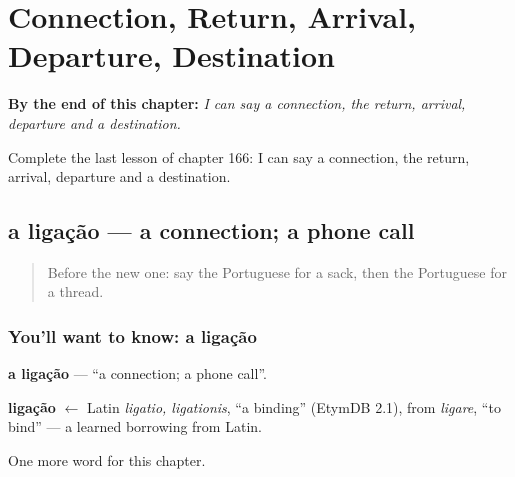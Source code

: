 
\chapter{Connection, Return, Arrival, Departure, Destination}
\label{ch:pt-connection-return-arrival-departure-destination}

\begin{chapteropening}
\textbf{By the end of this chapter:} \emph{I can say a connection, the return, arrival, departure and a destination.}

Complete the last lesson of chapter 166: I can say a connection, the return, arrival, departure and a destination.
\end{chapteropening}

\section[a ligação]{a ligação — a connection; a phone call}

\label{lesson:PT-C166-ligacao}



\begin{quote}
Before the new one: say the Portuguese for a sack, then the Portuguese for a thread.
\end{quote}

\subsection*{You'll want to know: a ligação}
\textbf{a ligação} — \textquotedblleft{}a connection; a phone call\textquotedblright{}.

\begin{cousinweb}
\textbf{ligação} $\leftarrow$ Latin \emph{ligatio, ligationis}, \textquotedblleft{}a binding\textquotedblright{} (EtymDB 2.1), from \emph{ligare}, \textquotedblleft{}to bind\textquotedblright{} — a learned borrowing from Latin.
\end{cousinweb}

\begin{grammarlens}[title={What you've built}]
One more word for this chapter.
\end{grammarlens}

